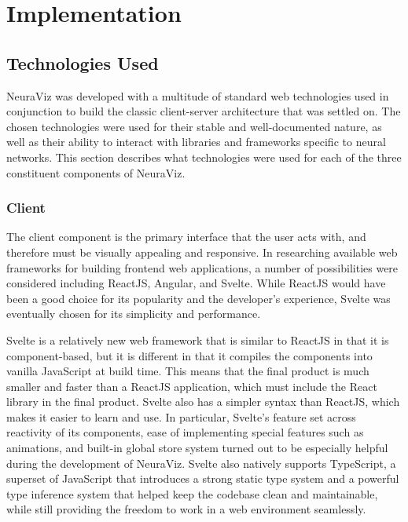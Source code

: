 \section{Implementation}
\label{sec:Implementation}

\subsection{Technologies Used}
NeuraViz was developed with a multitude of standard web technologies used in conjunction to build the classic client-server architecture that was settled on. The chosen technologies were used for their stable and well-documented nature, as well as their ability to interact with libraries and frameworks specific to neural networks. This section describes what technologies were used for each of the three constituent components of NeuraViz.

\subsubsection{Client}
The client component is the primary interface that the user acts with, and therefore must be visually appealing and responsive. In researching available web frameworks for building frontend web applications, a number of possibilities were considered including ReactJS, Angular, and Svelte. While ReactJS would have been a good choice for its popularity and the developer's experience, Svelte was eventually chosen for its simplicity and performance. 

Svelte \cite{svelte} is a relatively new web framework that is similar to ReactJS in that it is component-based, but it is different in that it compiles the components into vanilla JavaScript at build time. This means that the final product is much smaller and faster than a ReactJS application, which must include the React library in the final product. Svelte also has a simpler syntax than ReactJS, which makes it easier to learn and use. In particular, Svelte's feature set across reactivity of its components, ease of implementing special features such as animations, and built-in global store system turned out to be especially helpful during the development of NeuraViz. Svelte also natively supports TypeScript, a superset of JavaScript that introduces a strong static type system and a powerful type inference system that helped keep the codebase clean and maintainable, while still providing the freedom to work in a web environment seamlessly.

